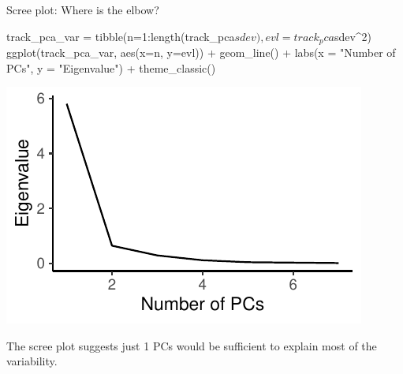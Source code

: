 \documentclass[a4paper]{article}\usepackage[]{graphicx}\usepackage[]{xcolor}
\makeatletter
\def\maxwidth{ %
  \ifdim\Gin@nat@width>\linewidth
    \linewidth
  \else
    \Gin@nat@width
  \fi
}
\makeatother
\begin{document}
Scree plot: Where is the elbow?
\begin{Schunk}
\begin{Sinput}
track_pca_var = tibble(n=1:length(track_pca$sdev), evl=track_pca$sdev^2)
ggplot(track_pca_var, aes(x=n, y=evl)) + geom_line() +
  labs(x = "Number of PCs", y = "Eigenvalue") +
  theme_classic()
\end{Sinput}


{\centering \includegraphics[width=\maxwidth]{figure/listings-unnamed-chunk-489-1} 

}

\end{Schunk}
The scree plot suggests just 1 PCs would be sufficient to explain most of the variability.
\end{document}
